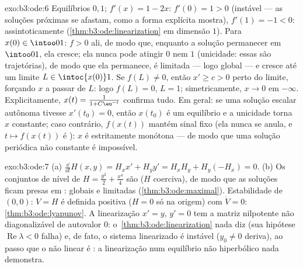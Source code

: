 \begin{solution}{exo:b3:ode:6}
Equilíbrios $0, 1$; $f'(x) = 1 - 2x$: $f'(0) = 1 > 0$
(instável --- as soluções próximas se afastam, como a forma
explícita mostra), $f'(1) = -1 < 0$: assintoticamente 
(\cref{thm:b3:ode:linearization} em dimensão $1$). Para
$x(0) \in \intoo01$: $f > 0$ ali, de modo que, enquanto a
solução permanecer em $\intoo01$, ela cresce; ela nunca pode atingir
$0$ nem $1$ (unicidade: essas são trajetórias), de modo que ela permanece,
é limitada --- logo global --- e cresce até um limite $L
\in \intoc{x(0)}1$. Se $f(L) \neq 0$, então $x' \geq c > 0$
perto do limite, forçando $x$ a passar de $L$: logo $f(L) = 0$, $L = 1$;
simetricamente, $x \to 0$ em $-\infty$. Explicitamente, $x(t) =
\frac1{1 + C\eu^{-t}}$ confirma tudo. Em geral: se uma
solução escalar autônoma tivesse $x'(t_0) = 0$, então $x(t_0)$
é um equilíbrio e a unicidade torna $x$ constante;
caso contrário, $f(x(t))$ mantém sinal fixo (ela nunca se anula,
e $t \mapsto f(x(t))$ é ): $x$ é estritamente
monótona --- de modo que uma solução periódica não constante é
impossível.
\end{solution}

\begin{solution}{exo:b3:ode:7}
(a) $\frac{\dd}{\dd t}H(x,y) = H_xx' + H_yy' = H_xH_y +
H_y(-H_x) = 0$.
(b) Os conjuntos de nível de $H = \frac{y^2}2 + \frac{x^4}4$ são
 ($H$ coerciva), de modo que as soluções ficam presas em :
globais e limitadas (\cref{thm:b3:ode:maximal}). Estabilidade de
$(0,0)$: $V = H$ é definida positiva ($H = 0$ só na
origem) com $\dot V = 0$: \cref{thm:b3:ode:lyapunov}. A
linearização $x' = y$, $y' = 0$ tem a matriz nilpotente
não diagonalizável de autovalor $0$:
o~\cref{thm:b3:ode:linearization} nada diz (sua hipótese
$\operatorname{Re}\lambda < 0$ falha) e, de fato, o
sistema linearizado é instável ($y_0 \ne 0$ deriva), ao passo que o
não linear é : a linearização num equilíbrio não
hiperbólico nada demonstra.
\end{solution}

